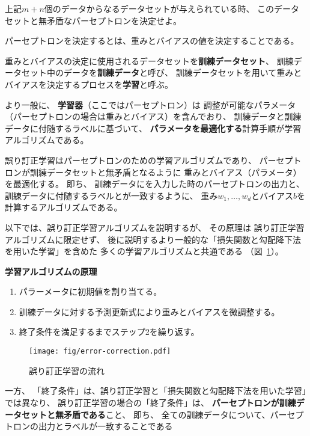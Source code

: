 \begin{screen}
  上記$m+n$個のデータからなるデータセットが与えられている時、
  このデータセットと無矛盾なパーセプトロンを決定せよ。
\end{screen}

パーセプトロンを決定するとは、重みとバイアスの値を決定することである。

重みとバイアスの決定に使用されるデータセットを\textbf{訓練データセット}、
訓練データセット中のデータを\textbf{訓練データ}と呼び、
訓練データセットを用いて重みとバイアスを決定するプロセスを\textbf{学習}と呼ぶ。

より一般に、
\textbf{学習器}（ここではパーセプトロン）は
調整が可能なパラメータ（パーセプトロンの場合は重みとバイアス）を含んでおり、
訓練データと訓練データに付随するラベルに基づいて、
\textbf{パラメータを最適化する}計算手順が学習アルゴリズムである。

誤り訂正学習はパーセプトロンのための学習アルゴリズムであり、
パーセプトロンが訓練データセットと無矛盾となるように
重みとバイアス（パラメータ）を最適化する。
即ち、
訓練データにを入力した時のパーセプトロンの出力と、
訓練データに付随するラベルとが一致するように、
重み$w_1, \dots, w_d$とバイアス$b$を計算するアルゴリズムである。

以下では、誤り訂正学習アルゴリズムを説明するが、
その原理は
誤り訂正学習アルゴリズムに限定せず、
後に説明するより一般的な「損失関数と勾配降下法を用いた学習」を含めた
多くの学習アルゴリズムと共通である
（図~\ref{fig:error-correction}）。

\begin{itembox}{\bf 学習アルゴリズムの原理}
  \begin{enumerate}
  \item パラーメータに初期値を割り当てる。
  \item 訓練データに対する予測更新式により重みとバイアスを微調整する。
  \item 終了条件を満足するまでステップ2を繰り返す。
  \end{enumerate}
\end{itembox}

\begin{figure}
  \texttt{[image: fig/error-correction.pdf]}
  \caption{誤り訂正学習の流れ}
  \label{fig:error-correction}
\end{figure}

一方、
「終了条件」は、誤り訂正学習と「損失関数と勾配降下法を用いた学習」では異なり、
誤り訂正学習の場合の「終了条件」は、
\textbf{パーセプトロンが訓練データセットと無矛盾である}こと、
即ち、
全ての訓練データについて、パーセプトロンの出力とラベルが一致することである

